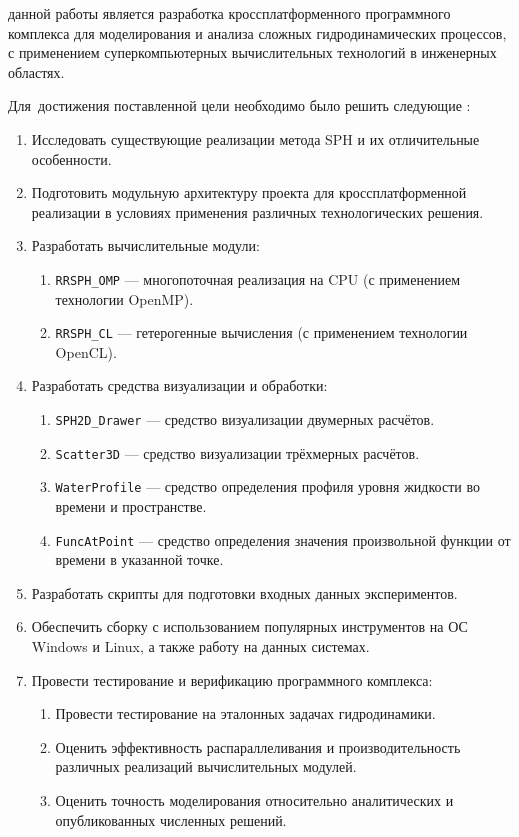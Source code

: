 {\aim} данной работы является разработка кроссплатформенного программного комплекса для моделирования и анализа сложных гидродинамических процессов, 
с применением суперкомпьютерных вычислительных технологий в инженерных областях.

Для~достижения поставленной цели необходимо было решить следующие {\tasks}:
\begin{enumerate}[beginpenalty=10000] %
  \item Исследовать существующие реализации метода SPH и их отличительные особенности.
  \item Подготовить модульную архитектуру проекта для кроссплатформенной реализации в условиях применения различных технологических решения.
  \item Разработать вычислительные модули:
  \begin{enumerate}
    \item \verb|RRSPH_OMP| --- многопоточная реализация на CPU (с применением технологии OpenMP).
    \item \verb|RRSPH_CL| --- гетерогенные вычисления (с применением технологии OpenCL).
  \end{enumerate}
  \item Разработать средства визуализации и обработки:
  \begin{enumerate}
    \item \verb|SPH2D_Drawer| --- средство визуализации двумерных расчётов.
    \item \verb|Scatter3D| --- средство визуализации трёхмерных расчётов.
    \item \verb|WaterProfile| --- средство определения профиля уровня жидкости во времени и пространстве.
    \item \verb|FuncAtPoint| --- средство определения значения произвольной функции от времени в указанной точке.
  \end{enumerate}
  \item Разработать скрипты для подготовки входных данных экспериментов.
  \item Обеспечить сборку с использованием популярных инструментов на ОС Windows и Linux, а также работу на данных системах.
  \item Провести тестирование и верификацию программного комплекса:
  \begin{enumerate}
    \item Провести тестирование на эталонных задачах гидродинамики.
    \item Оценить эффективность распараллеливания и производительность различных реализаций вычислительных модулей.
    \item Оценить точность моделирования относительно аналитических и опубликованных численных решений.
  \end{enumerate}
\end{enumerate}


